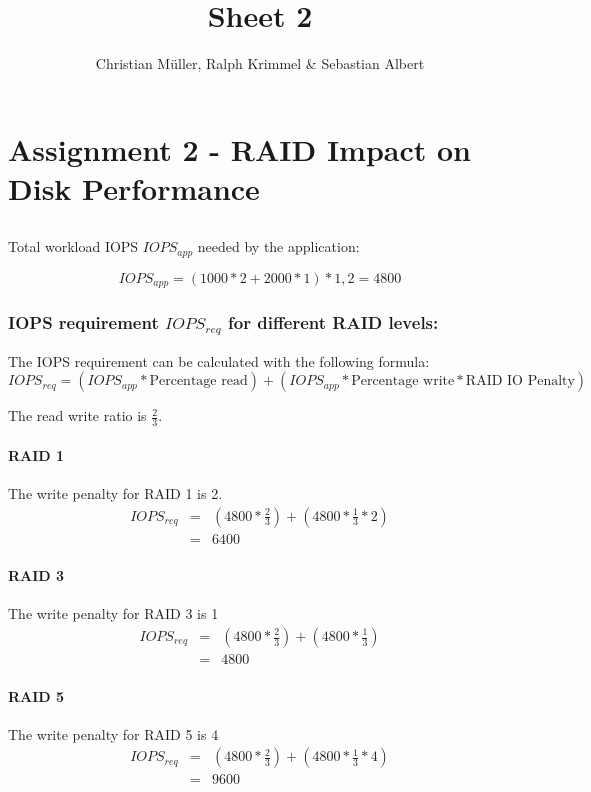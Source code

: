 \documentclass{article}
\title{Sheet 2}
\author{Christian Müller, Ralph Krimmel \& Sebastian Albert }
\begin{document}
\maketitle

\section*{Assignment 2 - RAID Impact on Disk Performance} 
\subsection{}

Total workload IOPS $IOPS_{app}$ needed by the application:

\begin{equation}
	IOPS_{app} = (1000 * 2 + 2000 * 1) * 1,2 = 4800
\end{equation}

\subsubsection*{IOPS requirement \textbf{$IOPS_{req}$} for different RAID levels:}
The IOPS requirement can be calculated with the following formula:
\begin{equation}
	IOPS_{req} = (IOPS_{app} * \text{Percentage read}) + (IOPS_{app} * \text{Percentage write} * \text{RAID IO Penalty})
\end{equation}


The read write ratio is $\frac{2}{3}$.

\paragraph{RAID 1}
The write penalty for RAID 1 is 2.
\begin{eqnarray*}
	IOPS_{req} &=&  (4800 * \frac{2}{3}) + (4800 * \frac{1}{3} * 2)  \\
		   &=&  6400
\end{eqnarray*}


\paragraph{RAID 3}
The write penalty for RAID 3 is 1
\begin{eqnarray*}
	IOPS_{req} &=&  (4800 * \frac{2}{3}) + (4800 * \frac{1}{3})  \\
		   &=&  4800
\end{eqnarray*}

\paragraph{RAID 5}
The write penalty for RAID 5 is 4
\begin{eqnarray*}
	IOPS_{req} &=&  (4800 * \frac{2}{3}) + (4800 * \frac{1}{3} * 4)  \\
		   &=&  9600
\end{eqnarray*}
\end{document}
